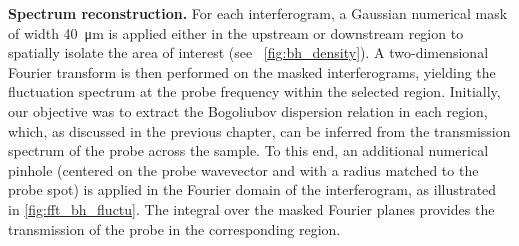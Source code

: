 \bigskip

\textbf{Spectrum reconstruction.} For each interferogram, a Gaussian numerical mask of width \SI{40}{\micro \meter} is applied either in the upstream or downstream region to spatially isolate the area of interest (see ~\autoref{fig:bh_density}). A two-dimensional Fourier transform is then performed on the masked interferograms, yielding the fluctuation spectrum at the probe frequency within the selected region.
Initially, our objective was to extract the Bogoliubov dispersion relation in each region, which, as discussed in the previous chapter, can be inferred from the transmission spectrum of the probe across the sample. To this end, an additional numerical pinhole (centered on the probe wavevector and with a radius matched to the probe spot) is applied in the Fourier domain of the interferogram, as illustrated in \autoref{fig:fft_bh_fluctu}.
The integral over the masked Fourier planes provides the transmission of the probe in the corresponding region.


